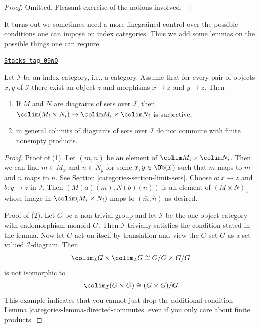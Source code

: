 \begin{proof}
Omitted. Pleasant exercise of the notions involved.
\end{proof}

It turns out we sometimes need a more finegrained control over the
possible conditions one can impose on index categories. Thus we add
some lemmas on the possible things one can require.

\begin{lemma}
\label{categories-lemma-preserve-products}
\href{https://stacks.math.columbia.edu/tag/09WQ}{\texttt{Stacks tag 09WQ}}

Let $\mathcal{I}$ be an index category, i.e., a category. Assume
that for every pair of objects $x, y$ of $\mathcal{I}$
there exist an object $z$ and morphisms $x \to z$ and $y \to z$.
Then
\begin{enumerate}
\item If $M$ and $N$ are diagrams of sets over $\mathcal{I}$,
then $\colim (M_i \times N_i) \to \colim M_i \times \colim N_i$
is surjective,
\item in general colimits of diagrams of sets over $\mathcal{I}$
do not commute with finite nonempty products.
\end{enumerate}
\end{lemma}

\begin{proof}

Proof of (1). Let $(\overline{m}, \overline{n})$
be an element of $\colim M_i \times \colim N_i$.
Then we can find $m \in M_x$ and $n \in N_y$ for some
$x, y \in \Ob(\mathcal{I})$ such that $m$ maps to
$\overline{m}$ and $n$ maps to $\overline{n}$. See
Section \ref{categories-section-limit-sets}.
Choose $a : x \to z$ and $b : y \to z$
in $\mathcal{I}$. Then $(M(a)(m), N(b)(n))$ is an element of
$(M \times N)_z$ whose image in $\colim (M_i \times N_i)$
maps to $(\overline{m}, \overline{n})$ as desired.

\medskip\noindent
Proof of (2). Let $G$ be a non-trivial group and
let $\mathcal{I}$ be the one-object category with endomorphism monoid $G$.
Then $\mathcal{I}$ trivially satisfies the condition stated in the lemma.
Now let $G$ act on itself by translation and view the $G$-set $G$
as a set-valued $\mathcal{I}$-diagram. Then
$$
\colim_\mathcal{I} G \times \colim_\mathcal{I} G \cong G/G \times G/G
$$
is not isomorphic to
$$
\colim_\mathcal{I} (G \times G) \cong (G \times G)/G
$$
This example indicates that you cannot just drop the additional
condition Lemma \ref{categories-lemma-directed-commutes}
even if you only care about finite products.
\end{proof}

